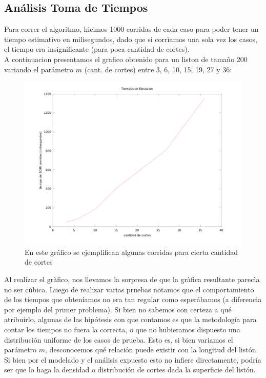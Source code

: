 \subsection{Análisis Toma de Tiempos}

\indent Para correr el algoritmo, hicimos 1000 corridas de cada caso para poder tener un tiempo estimativo en milisegundos, dado que si corrìamos una sola vez los casos, el tiempo era insignificante (para poca cantidad de cortes).\\
\indent A continuacion presentamos el grafico obtenido para un liston de tamaño 200 variando el parámetro $m$ (cant. de cortes) entre 3, 6, 10, 15, 19, 27 y 36:
\begin{figure}[h]
\centering                                                       
        \includegraphics[width=320pt]{./figs/p3tiempos.png}
	\caption{En este gráfico se ejemplifican algunas corridas para cierta cantidad de cortes}
	\label{fig:p3tiempos}
\end{figure}
\indent Al realizar el gràfico, nos llevamos la sorpresa de que la gràfica resultante parecìa no ser cúbica. Luego de realizar varias pruebas notamos que el comportamiento de los tiempos que obteníamos no era tan regular como esperábamos (a diferencia por ejemplo del primer problema). Si bien no sabemos con certeza a qué atribuirlo, algunas de las hipótesis con que contamos es que la metodología para contar los tiempos no fuera la correcta, o que no hubieramos dispuesto una distribución uniforme de los casos de prueba. Esto es, si bien variamos el parámetro $m$, desconocemos qué relación puede existir con la longitud del listón. Si bien por el modelado y el análisis expuesto esto no infiere directamente, podría ser que lo haga la densidad o distribución de cortes dada la superficie del listón.\\
